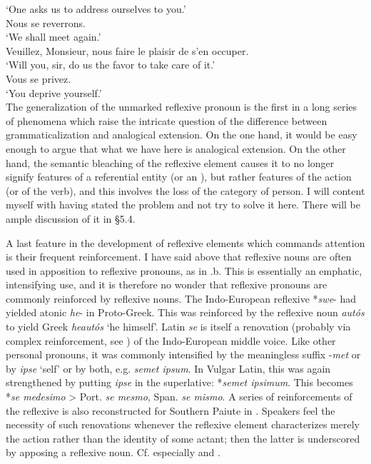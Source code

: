 \glt ‘One asks us to address ourselves to you.’\\
\ex Nous se reverrons.\\
\glt ‘We shall meet again.’\\
\ex Veuillez, Monsieur, nous faire le plaisir de s'en occuper.\\
\glt ‘Will you, sir, do us the favor to take care of it.’\\
\ex Vous se privez.\\
\glt ‘You deprive yourself.’\\
\z
\z
\noindent The generalization of the unmarked reflexive pronoun is the first in a long series of phenomena which raise the intricate question of the difference between grammaticalization and analogical extension. On the one hand, it would be easy enough to argue that what we have here is analogical extension. On the other hand, the semantic bleaching of the reflexive element causes it to no longer signify features of a referential entity (or an \np), but rather features of the action (or of the verb), and this involves the loss of the category of person. I will content myself with having stated the problem and not try to solve it here. There will be ample discussion of it in §5.4.

A last feature in the development of reflexive elements which commands attention is their frequent reinforcement. I have said above that reflexive nouns are often used in apposition to reflexive pronouns, as in .b. This is essentially an emphatic, intensifying use, and it is therefore no wonder that reflexive pronouns are commonly reinforced by reflexive nouns. The Indo-European reflexive *\textit{swe}{}- had yielded atonic \textit{he}{}- in Proto-Greek. This was reinforced by the reflexive noun \textit{autós} to yield Greek \textit{heautós} ‘he himself’. Latin \textit{se} is itself a renovation (probably via complex reinforcement, see ) of the Indo-European middle voice. Like other personal pronouns, it was commonly intensified by the meaningless suffix -\textit{met} or by \textit{ipse} ‘self’ or by both, e.g. \textit{semet ipsum}. In Vulgar Latin, this was again strengthened by putting \textit{ipse} in the superlative: *\textit{semet ipsimum}. This becomes *\textit{se medesimo} {\textgreater} Port. \textit{se mesmo}, Span. \textit{se mismo}. A series of reinforcements of the reflexive is also reconstructed for Southern Paiute in \citet[107]{Langacker1977}. Speakers feel the necessity of such renovations whenever the reflexive element characterizes merely the action rather than the identity of some actant; then the latter is underscored by apposing a reflexive noun. Cf. especially \citet[238--244]{Faltz1977} and \citet[329--334]{Strunk1980}.

